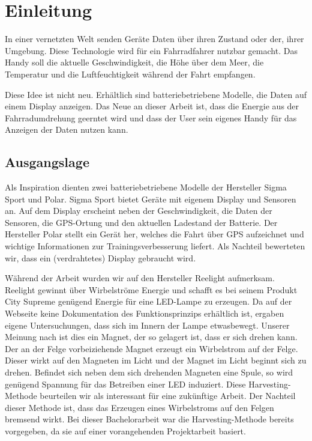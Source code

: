 \chapter{Einleitung}

In einer vernetzten Welt senden Geräte Daten über ihren Zustand oder der, ihrer Umgebung. Diese Technologie wird für ein Fahrradfahrer nutzbar gemacht. Das Handy soll die aktuelle Geschwindigkeit, die Höhe über dem Meer, die Temperatur und die Luftfeuchtigkeit während der Fahrt empfangen.

Diese Idee ist nicht neu. Erhältlich sind batteriebetriebene Modelle, die Daten auf einem Display anzeigen. Das Neue an dieser Arbeit ist, dass die Energie aus der Fahrradumdrehung geerntet wird und dass der User sein eigenes Handy für das Anzeigen der Daten nutzen kann.


\section{Ausgangslage}

Als Inspiration dienten zwei batteriebetriebene Modelle der Hersteller Sigma Sport und Polar. Sigma Sport bietet Geräte mit eigenem Display und  Sensoren an. Auf dem Display erscheint neben der Geschwindigkeit, die Daten der Sensoren, die GPS-Ortung und den aktuellen Ladestand der Batterie. Der Hersteller Polar stellt ein Gerät her, welches die Fahrt über GPS aufzeichnet und wichtige Informationen zur Trainingsverbesserung liefert. Als Nachteil bewerteten wir, dass ein (verdrahtetes) Display gebraucht wird.

Während der Arbeit wurden wir auf den Hersteller Reelight aufmerksam. Reelight gewinnt über Wirbelströme Energie und schafft es bei seinem Produkt City Supreme genügend Energie für eine LED-Lampe zu erzeugen. Da auf der Webseite keine Dokumentation des Funktionsprinzips erhältlich ist, ergaben eigene Untersuchungen, dass sich im Innern der Lampe \glqq etwas\grqq bewegt. Unserer Meinung nach ist dies ein Magnet, der so gelagert ist, dass er sich drehen kann. Der an der Felge vorbeiziehende Magnet erzeugt ein Wirbelstrom auf der Felge. Dieser wirkt auf den Magneten im Licht und der Magnet im Licht beginnt sich zu drehen. Befindet sich neben dem sich drehenden Magneten eine Spule, so wird genügend Spannung für das Betreiben einer LED induziert. Diese Harvesting-Methode beurteilen wir als interessant für eine zukünftige Arbeit. Der Nachteil dieser Methode ist, dass das Erzeugen eines Wirbelstroms auf den Felgen bremsend wirkt.  Bei dieser Bachelorarbeit war die Harvesting-Methode bereits vorgegeben, da sie auf einer vorangehenden Projektarbeit basiert.


